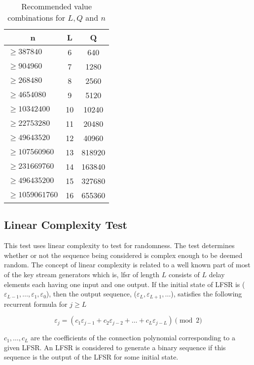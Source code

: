 \begin{table}[h!]
    \centering
    \begin{tabular}{|l|c|c|}
        \hline
        \multicolumn{1}{|c|}{\textbf{n}} & \textbf{L} & \textbf{Q} \\ \hline
        $\geq387840$ & 6 & 640 \\ \hline
        $\geq904960$ & 7 & 1280 \\ \hline
        $\geq268480$ & 8 & 2560 \\ \hline
        $\geq4654080$ & 9 & 5120 \\ \hline
        $\geq10342400$ & 10 & 10240 \\ \hline
        $\geq22753280$ & 11 & 20480 \\ \hline
        $\geq49643520$ & 12 & 40960 \\ \hline
        $\geq107560960$ & 13 & 818920 \\ \hline
        $\geq231669760$ & 14 & 163840 \\ \hline
        $\geq496435200$ & 15 & 327680 \\ \hline
        $\geq1059061760$ & 16 & 655360 \\ \hline
    \end{tabular}
    \caption{Recommended value combinations for $L,Q$ and $n$}
    \label{tab:ust_rec_vals}
\end{table}

\subsection{Linear Complexity Test}

This test uses linear complexity to test for randomness. The test determines whether or not the sequence being considered is complex enough to be deemed random. The concept of linear complexity is related to a well known part of most of the key stream generators which is, \acrfull{lfsr} of length $L$ consists of $L$ delay elements each having one input and one output. If the initial state of LFSR is ($\varepsilon_{L-1}, \ldots, \varepsilon_1, \varepsilon_0$), then the output sequence, ($\varepsilon_L, \varepsilon_{L+1}, \ldots$), satisfies the following recurrent formula for $j \geq L$

\[
    \varepsilon_j=(c_1\varepsilon_{j-1}+c_2\varepsilon_{j-2}+\ldots+c_L\varepsilon_{j-L}) \pmod{2}
\]
 
 $c_1,\ldots,c_L$ are the coefficients of the connection polynomial corresponding to a given LFSR. An LFSR is considered to generate a binary sequence if this sequence is the output of the LFSR for some initial state.
 
